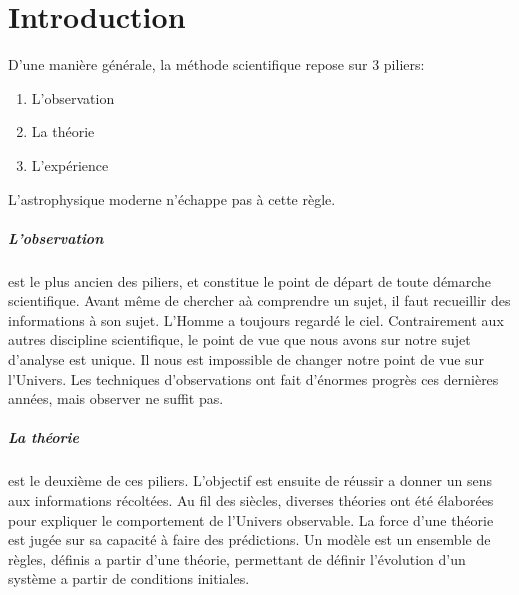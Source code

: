 \chapter{Introduction}



D'une manière générale, la méthode scientifique repose sur 3 piliers: 
\begin{enumerate}
\item L'observation
\item La théorie
\item L'expérience
\end{enumerate}
L'astrophysique moderne n’échappe pas à cette règle.



\paragraph{L'observation} est le plus ancien des piliers, et constitue le point de départ de toute démarche scientifique.
Avant même de chercher aà comprendre un sujet, il faut recueillir des informations à son sujet. %
L'Homme a toujours regardé le ciel.
Contrairement aux autres discipline scientifique, le point de vue que nous avons sur notre sujet d'analyse est unique. 
Il nous est impossible de changer notre point de vue sur l'Univers.
Les techniques d'observations ont fait d’énormes progrès ces dernières années, mais observer ne suffit pas.


\paragraph{La théorie} est le deuxième de ces piliers.
L'objectif est ensuite de réussir a donner un sens aux informations récoltées.
Au fil des siècles, diverses théories ont été élaborées pour expliquer le comportement de l'Univers observable.
La force d'une théorie est jugée sur sa capacité à faire des prédictions.
Un modèle est un ensemble de règles, définis a partir d'une théorie, permettant de définir l'évolution d'un système a partir de conditions initiales.

